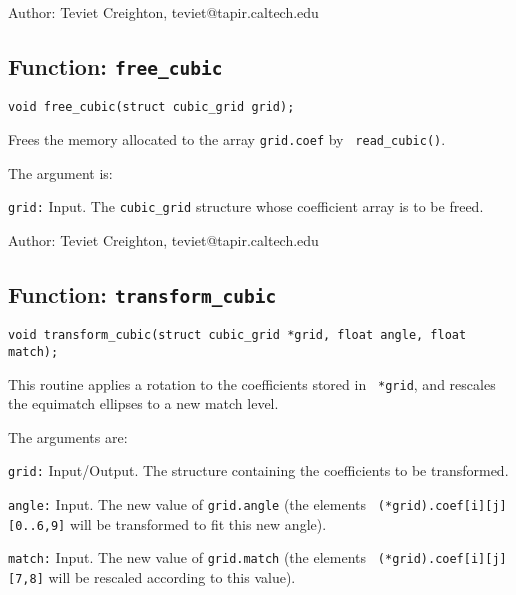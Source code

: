\begin{description}
\item{Author:}
  Teviet Creighton, teviet@tapir.caltech.edu
\end{description}


\clearpage
\subsection{Function: {\tt free\_cubic}}
\label{ss:free_cubic}

\begin{verbatim}
void free_cubic(struct cubic_grid grid);
\end{verbatim}
Frees the memory allocated to the array {\tt grid.coef} by {\tt
read\_cubic()}.

The argument is:

\begin{description}
\item{\tt grid:}
  Input.  The {\tt cubic\_grid} structure whose coefficient array is
  to be freed.

\end{description}

\begin{description}
\item{Author:}
  Teviet Creighton, teviet@tapir.caltech.edu
\end{description}


\clearpage
\subsection{Function: {\tt transform\_cubic}}
\label{ss:transform_cubic}

\begin{verbatim}
void transform_cubic(struct cubic_grid *grid, float angle, float match);
\end{verbatim}
This routine applies a rotation to the coefficients stored in {\tt
*grid}, and rescales the equimatch ellipses to a new match level.

The arguments are:

\begin{description}
\item{\tt grid:}
  Input/Output.  The structure containing the coefficients to be
  transformed.

\item{\tt angle:}
  Input.  The new value of {\tt grid.angle} (the elements {\tt
  (*grid).coef[i][j][0..6,9]} will be transformed to fit this new
  angle).

\item{\tt match:}
  Input.  The new value of {\tt grid.match} (the elements {\tt
  (*grid).coef[i][j][7,8]} will be rescaled according to this value).

\end{description}

